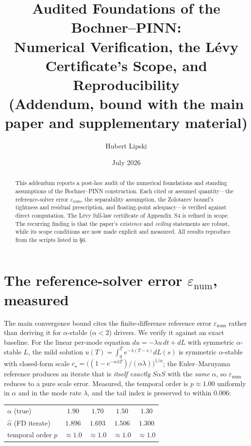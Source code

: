 \documentclass[11pt]{article}
\title{\vspace{-2em}Audited Foundations of the Bochner--PINN:\\
Numerical Verification, the L\'evy Certificate's Scope, and Reproducibility\\[0.3em]
\large (Addendum, bound with the main paper and supplementary material)}
\author{Hubert Lipski}
\date{July 2026}
\begin{document}
\maketitle

\begin{abstract}
This addendum reports a post-hoc audit of the numerical foundations and standing
assumptions of the Bochner--PINN construction. Each cited or assumed quantity---the
reference-solver error $\varepsilon_{\mathrm{num}}$, the separability assumption, the
Zolotarev bound's tightness and residual prescription, and floating-point adequacy---is
verified against direct computation. The L\'evy full-law certificate of Appendix~S4 is
refined in scope. The recurring finding is that the paper's \emph{existence} and
\emph{ceiling} statements are robust, while its scope conditions are now made explicit and
measured. All results reproduce from the scripts listed in \S6.
\end{abstract}

\section{The reference-solver error $\varepsilon_{\mathrm{num}}$, measured}
The main convergence bound cites the finite-difference reference error
$\varepsilon_{\mathrm{num}}$ rather than deriving it for $\alpha$-stable ($\alpha<2$)
drivers. We verify it against an exact baseline. For the linear per-mode equation
$du=-\lambda u\,dt+dL$ with symmetric $\alpha$-stable $L$, the mild solution
$u(T)=\int_0^T e^{-\lambda(T-s)}dL(s)$ is symmetric $\alpha$-stable with closed-form scale
$c_\star=\big((1-e^{-\alpha\lambda T})/(\alpha\lambda)\big)^{1/\alpha}$; the Euler--Maruyama
reference produces an iterate that is \emph{itself exactly} $S\alpha S$ with the \emph{same}
$\alpha$, so $\varepsilon_{\mathrm{num}}$ reduces to a pure scale error. Measured, the
temporal order is $p\approx1.00$ uniformly in $\alpha$ and in the mode rate $\lambda$, and
the tail index is preserved to within $0.006$:

\begin{center}
\begin{tabular}{lcccc}
\toprule
$\alpha$ (true) & $1.90$ & $1.70$ & $1.50$ & $1.30$\\
$\hat\alpha$ (FD iterate) & $1.896$ & $1.693$ & $1.506$ & $1.300$\\
temporal order $p$ & $\approx 1.0$ & $\approx 1.0$ & $\approx 1.0$ & $\approx 1.0$\\
\bottomrule
\end{tabular}
\end{center}
\end{document}
